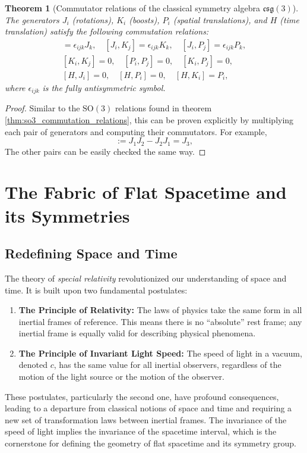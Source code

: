 \documentclass{amsart}
\newtheorem{theorem}{Theorem}[section]
\theoremstyle{definition}
\theoremstyle{remark}
\begin{document}
\begin{theorem}[Commutator relations of the classical symmetry algebra $\mathfrak{csg}(3)$]\label{thm:csg3_commutation_relations}
  The generators $J_i$ (rotations), $K_i$ (boosts), $P_i$ (spatial translations), and $H$ (time translation) satisfy the following commutation relations:
  \begin{gather*}
    [J_i, J_j] = \epsilon_{ijk} J_k, \quad
    [J_i, K_j] = \epsilon_{ijk} K_k, \quad
    [J_i, P_j] = \epsilon_{ijk} P_k, \\
    [K_i, K_j] = 0, \quad
    [P_i, P_j] = 0, \quad
    [K_i, P_j] = 0, \\
    [H, J_i] = 0, \quad
    [H, P_i] = 0, \quad
    [H, K_i] = P_i,
  \end{gather*}
  where $\epsilon_{ijk}$ is the fully antisymmetric symbol.
\end{theorem}
\begin{proof}
  Similar to the $\mathrm{SO}(3)$ relations found in theorem \ref{thm:so3_commutation_relations}, this can be proven explicitly by multiplying each pair of generators and computing their commutators.
  For example,
  \begin{equation*}
    [J_1, J_2] := J_1 J_2 - J_2 J_1 = J_3,
  \end{equation*}
  The other pairs can be easily checked the same way.
\end{proof}

\section{The Fabric of Flat Spacetime and its Symmetries}
\label{sec:sr}

\subsection{Redefining Space and Time}
\label{subsec:sr_postulates}
The theory of \emph{special relativity} revolutionized our understanding of space and time.
It is built upon two fundamental postulates:

\begin{enumerate}
  \item \textbf{The Principle of Relativity:} The laws of physics take the same form in all inertial frames of reference.
  This means there is no ``absolute'' rest frame; any inertial frame is equally valid for describing physical phenomena.
  \item \textbf{The Principle of Invariant Light Speed:} The speed of light in a vacuum, denoted $c$, has the same value for all inertial observers, regardless of the motion of the light source or the motion of the observer.
\end{enumerate}
These postulates, particularly the second one, have profound consequences, leading to a departure from classical notions of space and time and requiring a new set of transformation laws between inertial frames.
The invariance of the speed of light implies the invariance of the spacetime interval, which is the cornerstone for defining the geometry of flat spacetime and its symmetry group.
\end{document}
